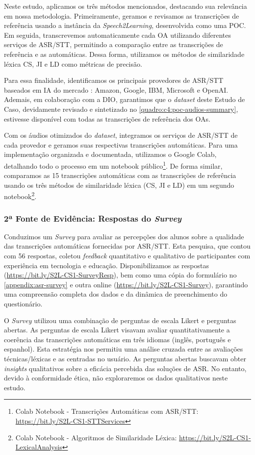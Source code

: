 Neste estudo, aplicamos os três métodos mencionados, destacando sua relevância em nossa metodologia. Primeiramente, geramos e revisamos as transcrições de referência usando a instância da \textit{Speech2Learning}, desenvolvida como uma POC. Em seguida, transcrevemos automaticamente cada OA utilizando diferentes serviços de ASR/STT, permitindo a comparação entre as transcrições de referência e as automáticas. Dessa forma, utilizamos os métodos de similaridade léxica CS, JI e LD como métricas de precisão.

Para essa finalidade, identificamos os principais provedores de ASR/STT baseados em IA do mercado \cite{Gartner2023}: Amazon, Google, IBM, Microsoft e OpenAI. Ademais, em colaboração com a DIO, garantimos que o \textit{dataset} deste Estudo de Caso, devidamente revisado e sintetizado no \autoref{quadro:c4:poc-audios-summary}, estivesse disponível com todas as transcrições de referência dos OAs.

Com os áudios otimizados do \textit{dataset}, integramos os serviços de ASR/STT de cada provedor e geramos suas respectivas transcrições automáticas. Para uma implementação organizada e documentada, utilizamos o Google Colab, detalhando todo o processo em um notebook público\footnote{Colab Notebook - Transcrições Automáticas com ASR/STT: \url{https://bit.ly/S2L-CS1-STTServices}}. De forma similar, comparamos as 15 transcrições automáticas com as transcrições de referência usando os três métodos de similaridade léxica (CS, JI e LD) em um segundo notebook\footnote{Colab Notebook - Algoritmos de Similaridade Léxica: \url{https://bit.ly/S2L-CS1-LexicalAnalysis}}.

\subsubsection{2ª Fonte de Evidência: Respostas do \textit{Survey}}

Conduzimos um \textit{Survey} para avaliar as percepções dos alunos sobre a qualidade das transcrições automáticas fornecidas por ASR/STT. Esta pesquisa, que contou com 56 respostas, coletou \textit{feedback} quantitativo e qualitativo de participantes com experiência em tecnologia e educação. Disponibilizamos as respostas (\url{https://bit.ly/S2L-CS1-SurveyResp}), bem como uma cópia do formulário no \autoref{appendix:asr-survey} e outra online (\url{https://bit.ly/S2L-CS1-Survey}), garantindo uma compreensão completa dos dados e da dinâmica de preenchimento do questionário.

O \textit{Survey} utilizou uma combinação de perguntas de escala Likert e perguntas abertas. As perguntas de escala Likert visavam avaliar quantitativamente a coerência das transcrições automáticas em três idiomas (inglês, português e espanhol). Esta estratégia nos permitiu uma análise cruzada entre as avaliações técnicas/léxicas e as centradas no usuário. As perguntas abertas buscavam obter \textit{insights} qualitativos sobre a eficácia percebida das soluções de ASR. No entanto, devido à conformidade ética, não exploraremos os dados qualitativos neste estudo.

